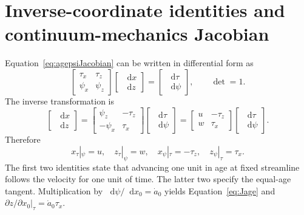 \documentclass[review]{igs}
\begin{document}
\section{Inverse-coordinate identities and continuum-mechanics Jacobian}
\label{app:inverse}

Equation~\ref{eq:agepsiJacobian} can be written in differential form as
\begin{equation}
\begin{bmatrix}
\tau_x & \tau_z\\
\psi_x & \psi_z
\end{bmatrix}
\begin{bmatrix}
\mathop{}\!\mathrm{d} x\\
\mathop{}\!\mathrm{d} z
\end{bmatrix}
=
\begin{bmatrix}
\mathop{}\!\mathrm{d}\tau\\
\mathop{}\!\mathrm{d}\psi
\end{bmatrix},
\qquad
\det=1.
\end{equation}
The inverse transformation is
\begin{equation}
\begin{bmatrix}
\mathop{}\!\mathrm{d} x\\
\mathop{}\!\mathrm{d} z
\end{bmatrix}
=
\begin{bmatrix}
\psi_z & -\tau_z\\
-\psi_x & \tau_x
\end{bmatrix}
\begin{bmatrix}
\mathop{}\!\mathrm{d}\tau\\
\mathop{}\!\mathrm{d}\psi
\end{bmatrix}
=
\begin{bmatrix}
 u & -\tau_z\\
 w & \tau_x
\end{bmatrix}
\begin{bmatrix}
\mathop{}\!\mathrm{d}\tau\\
\mathop{}\!\mathrm{d}\psi
\end{bmatrix}.
\label{eq:inversemap}
\end{equation}
Therefore
\begin{equation}
 x_{\tau}|_{\psi}=u,
 \quad
 z_{\tau}|_{\psi}=w,
 \quad
 x_{\psi}|_{\tau}=-\tau_z,
 \quad
 z_{\psi}|_{\tau}=\tau_x.
\end{equation}
The first two identities state that advancing one unit in age at fixed streamline follows the velocity for one unit of time. The latter two specify the equal-age tangent. Multiplication by \(\mathop{}\!\mathrm{d}\psi/\mathop{}\!\mathrm{d} x_0=\dot a_0\) yields Equation~\ref{eq:Jage} and \(\left.\partial z/\partial x_0\right|_{\tau}=\dot a_0\tau_x\).
\end{document}
